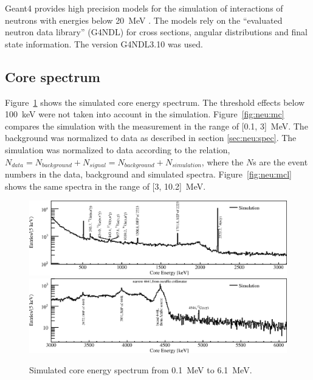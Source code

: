 Geant4 provides high precision models for the simulation of interactions of neutrons with energies below 20~MeV \cite{Gea03, Gea06}. The models rely on the ``evaluated neutron data library'' (G4NDL) for cross sections, angular distributions and final state information. The version G4NDL3.10 was used.

\subsection{Core spectrum}
\label{sec:neu:spemc}
Figure~\ref{fig:neu:mca} shows the simulated core energy spectrum. The threshold effects below 100~keV were not taken into account in the simulation. Figure~\ref{fig:neu:mc} compares the simulation with the measurement in the range of [0.1, 3]~MeV. The background was normalized to data as described in section \ref{sec:neu:spec}. The simulation was normalized to data according to the relation, $N_{data} = N_{background} + N_{signal} = N_{background} + N_{simulation}$, where the $N$s are the event numbers in the data, background and simulated spectra. Figure~\ref{fig:neu:mcl} shows the same spectra in the range of [3, 10.2]~MeV.

\begin{figure}[tbhp]
  \centering
  \includegraphics[width=\textwidth,clip]{spectra_mc1}
  \includegraphics[width=\textwidth,clip]{spectra_mc2}
  \caption{Simulated core energy spectrum from 0.1~MeV to 6.1~MeV.}
  \label{fig:neu:mca}
\end{figure}


